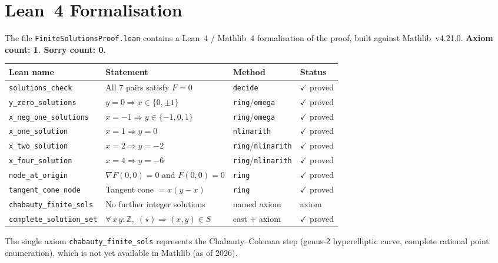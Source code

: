 \documentclass[12pt, a4paper]{article}
\theoremstyle{definition}
\newcommand{\Z}{\mathbb{Z}}
\begin{document}
\section{Lean~4 Formalisation}

The file \texttt{FiniteSolutionsProof.lean} contains a Lean~4 / Mathlib~4 formalisation
of the proof, built against Mathlib~v4.21.0.  \textbf{Axiom count: 1.  Sorry count: 0.}

\begin{center}
\renewcommand{\arraystretch}{1.2}
\begin{tabular}{l l l l}
\toprule
Lean name & Statement & Method & Status \\
\midrule
\texttt{solutions\_check} & All 7 pairs satisfy $F=0$ & \texttt{decide} & $\checkmark$ proved \\
\texttt{y\_zero\_solutions} & $y=0 \Rightarrow x \in \{0,\pm1\}$ & \texttt{ring}/\texttt{omega} & $\checkmark$ proved \\
\texttt{x\_neg\_one\_solutions} & $x=-1 \Rightarrow y \in \{-1,0,1\}$ & \texttt{ring}/\texttt{omega} & $\checkmark$ proved \\
\texttt{x\_one\_solution} & $x=1 \Rightarrow y=0$ & \texttt{nlinarith} & $\checkmark$ proved \\
\texttt{x\_two\_solution} & $x=2 \Rightarrow y=-2$ & \texttt{ring}/\texttt{nlinarith} & $\checkmark$ proved \\
\texttt{x\_four\_solution} & $x=4 \Rightarrow y=-6$ & \texttt{ring}/\texttt{nlinarith} & $\checkmark$ proved \\
\texttt{node\_at\_origin} & $\nabla F(0,0)=0$ and $F(0,0)=0$ & \texttt{ring} & $\checkmark$ proved \\
\texttt{tangent\_cone\_node} & Tangent cone $= x(y-x)$ & \texttt{ring} & $\checkmark$ proved \\
\texttt{chabauty\_finite\_sols} & No further integer solutions & named axiom & axiom \\
\texttt{complete\_solution\_set} & $\forall\,x\,y:\Z,\;(\star) \Rightarrow (x,y) \in S$ & cast + axiom & $\checkmark$ proved \\
\bottomrule
\end{tabular}
\end{center}

The single axiom \texttt{chabauty\_finite\_sols} represents the Chabauty--Coleman step
(genus-2 hyperelliptic curve, complete rational point enumeration), which is not yet available
in Mathlib (as of 2026).
\end{document}
